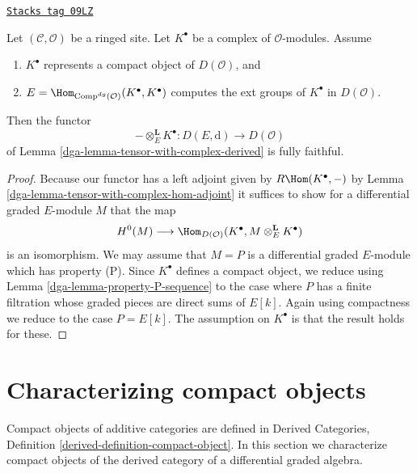 \begin{lemma}
\label{dga-lemma-fully-faithful-in-compact-case}
\href{https://stacks.math.columbia.edu/tag/09LZ}{\texttt{Stacks tag 09LZ}}

Let $(\mathcal{C}, \mathcal{O})$ be a ringed site.
Let $K^\bullet$ be a complex of $\mathcal{O}$-modules.
Assume
\begin{enumerate}
\item $K^\bullet$ represents a compact object of $D(\mathcal{O})$, and
\item $E = \Hom_{\text{Comp}^{dg}(\mathcal{O})}(K^\bullet, K^\bullet)$
computes the ext groups of $K^\bullet$ in $D(\mathcal{O})$.
\end{enumerate}
Then the functor
$$
- \otimes_E^\mathbf{L} K^\bullet :
D(E, \text{d})
\longrightarrow
D(\mathcal{O})
$$
of Lemma \ref{dga-lemma-tensor-with-complex-derived} is fully faithful.
\end{lemma}

\begin{proof}

Because our functor has a left adjoint given by
$R\Hom(K^\bullet, -)$ by Lemma \ref{dga-lemma-tensor-with-complex-hom-adjoint}
it suffices to show for a differential graded $E$-module $M$ that the map
$$
H^0(M) \longrightarrow
\Hom_{D(\mathcal{O})}(K^\bullet, M \otimes_E^\mathbf{L} K^\bullet)
$$
is an isomorphism. We may assume that $M = P$ is a differential graded
$E$-module which has property (P). Since $K^\bullet$ defines a
compact object, we reduce using
Lemma \ref{dga-lemma-property-P-sequence}
to the case where $P$ has a finite filtration whose graded pieces
are direct sums of $E[k]$. Again using compactness we reduce
to the case $P = E[k]$. The assumption on $K^\bullet$ is that
the result holds for these.
\end{proof}

\section{Characterizing compact objects}
\label{dga-section-compact}
Compact objects of additive categories are defined in
Derived Categories, Definition \ref{derived-definition-compact-object}.
In this section we characterize compact objects of the derived
category of a differential graded algebra.

